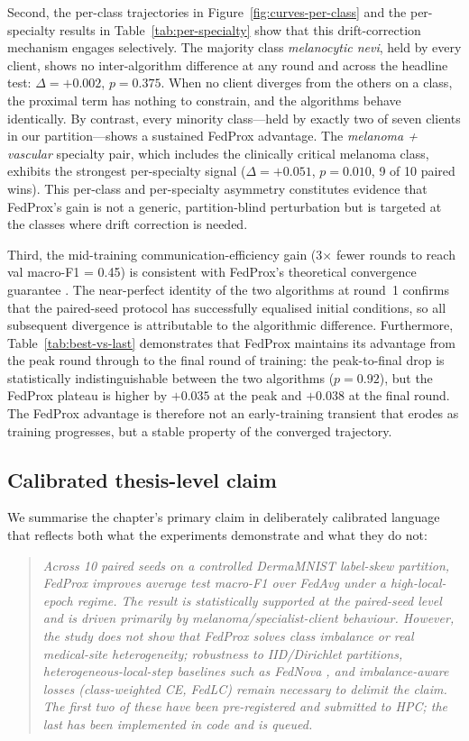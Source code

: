 \documentclass[11pt,a4paper]{article}
\begin{document}
Second, the per-class trajectories in Figure~\ref{fig:curves-per-class}
and the per-specialty results in Table~\ref{tab:per-specialty} show that
this drift-correction mechanism engages selectively. The majority class
\textit{melanocytic nevi}, held by every client, shows no inter-algorithm
difference at any round and across the headline test: $\Delta = +0.002$,
$p = 0.375$. When no client diverges from the others on a class, the
proximal term has nothing to constrain, and the algorithms behave
identically. By contrast, every minority class---held by exactly two of
seven clients in our partition---shows a sustained FedProx advantage. The
\textit{melanoma + vascular} specialty pair, which includes the clinically
critical melanoma class, exhibits the strongest per-specialty signal
($\Delta = +0.051$, $p = 0.010$, 9 of 10 paired wins). This per-class and
per-specialty asymmetry constitutes evidence that FedProx's gain is not a
generic, partition-blind perturbation but is targeted at the classes where
drift correction is needed.

Third, the mid-training communication-efficiency gain (3$\times$ fewer
rounds to reach val macro-F1 = 0.45) is consistent with FedProx's
theoretical convergence guarantee \citep{li2020fedprox}. The
near-perfect identity of the two algorithms at round~1 confirms that
the paired-seed protocol has successfully equalised initial conditions,
so all subsequent divergence is attributable to the algorithmic
difference. Furthermore, Table~\ref{tab:best-vs-last} demonstrates that
FedProx maintains its advantage from the peak round through to the final
round of training: the peak-to-final drop is statistically
indistinguishable between the two algorithms ($p = 0.92$), but the
FedProx plateau is higher by $+0.035$ at the peak and $+0.038$ at the
final round. The FedProx advantage is therefore not an early-training
transient that erodes as training progresses, but a stable property of
the converged trajectory.

\subsection{Calibrated thesis-level claim}
We summarise the chapter's primary claim in deliberately calibrated
language that reflects both what the experiments demonstrate and what
they do not:
\begin{quote}
\textit{Across 10 paired seeds on a controlled DermaMNIST label-skew
partition, FedProx improves average test macro-F1 over FedAvg under a
high-local-epoch regime. The result is statistically supported at the
paired-seed level and is driven primarily by melanoma/specialist-client
behaviour. However, the study does not show that FedProx solves class
imbalance or real medical-site heterogeneity; robustness to IID/Dirichlet
partitions, heterogeneous-local-step baselines such as FedNova
\citep{wang2020fednova}, and imbalance-aware losses (class-weighted CE,
FedLC) remain necessary to delimit the claim. The first two of these
have been pre-registered and submitted to HPC; the last has been
implemented in code and is queued.}
\end{quote}
\end{document}
